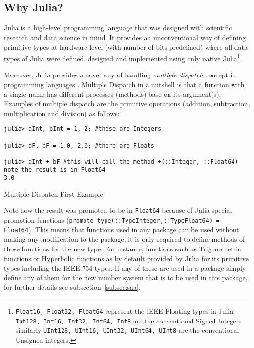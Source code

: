 \subsection{Why Julia?}

Julia \cite{Julia,Bezanson2017} is a high-level programming language that was designed with scientific research and data science in mind. It provides an unconventional way of defining primitive types at hardware level (with number of bits predefined) where all data types of Julia were defined, designed and implemented using only native Julia\footnote{\texttt{Float16, Float32, Float64} represent the IEEE Floating types in Julia. \texttt{Int128, Int16, Int32, Int64, Int8} are the conventional Signed-Integers similarly \texttt{UInt128, UInt16, UInt32, UInt64, UInt8} are the conventional Unsigned integers.}.

Moreover, Julia provides a novel way of handling \emph{multiple dispatch} \cite{WikiMultipleDispatch} concept in programming languages \cite{JuliaMehtods}. Multiple Dispatch in a nutshell is that a function with a single name has different processes (methods) base on its argument(s). Examples of multiple dispatch are the primitive operations (addition, subtraction, multiplication and division) as follows:

\begin{listing}[H]
\begin{verbatim}
julia> aInt, bInt = 1, 2; #these are Integers

julia> aF, bF = 1.0, 2.0; #there are Floats

julia> aInt + bF #this will call the method +(::Integer, ::Float64) note the result is in Float64
3.0
\end{verbatim}
\caption{Multiple Dispatch First Example}
\end{listing}

Note how the result was promoted to be in \texttt{Float64} because of Julia special promotion functions (\texttt{promote_type(::Type{Integer},::Type{Float64}) = Float64}). This means that functions used in any package can be used without making any modification to the package, it is only required to define methods of those functions for the new type. For instance, functions such as Trigonometric functions or Hyperbolic functions as by default provided by Julia for its primitive types including the IEEE-754 types. If any of these are used in a package simply define any of them for the new number system that is to be used in this package, for further details see subsection~\ref{subsec:saa}.


